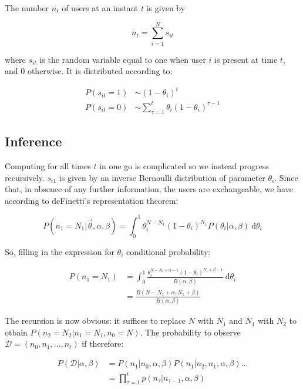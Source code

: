 \documentclass{tufte-book}
\begin{document}
The number $n_t$ of users at an instant $t$ is given by

\begin{equation}
  n_t = \sum_{i=1}^N s_{it}
\end{equation}

where $s_{it}$ is the random variable equal to one when user $i$ is present at time $t$, and $0$ otherwise. It
is distributed according to:

\begin{align*}
  P(s_{it}=1) &\sim \left(1-\theta_i\right)^t\\
  P(s_{it}=0) &\sim \sum_{\tau=1}^t \theta_i \left(1-\theta_i\right)^{\tau-1}
\end{align*}

    \subsection{Inference}%
    \label{sub:inference}

Computing for all times $t$ in one go is complicated so we instead progress recursively. $s_{i1}$ is given by an
inverse Bernoulli distribution of parameter $\theta_i$. Since that, in absence of any further information, the
users are exchangeable, we have according to deFinetti's representation theorem:

\begin{equation}
  P(n_1 = N_1 | \vec{\theta}, \alpha, \beta) = \int_0^1 \theta_i^{N-N_1} \left(1-\theta_i\right)^{N_1}
  P(\theta_i|\alpha, \beta)\: \mathrm{d}\theta_i
\end{equation}

So, filling in the expression for $\theta_i$ conditional probability:

\begin{align}
  P(n_1=N_1) &= \int_0^1 \frac{\theta_i^{N-N_1+\alpha-1}\left(1-\theta_i\right)^{N_1+\beta-1}}{B(\alpha,
  \beta)}\:\mathrm{d}\theta_i \nonumber\\
  &= \frac{B(N-N_1+\alpha, N_1+\beta)}{B(\alpha, \beta)}
\label{sbg:recursion-formula}
\end{align}

The recursion is now obvious: it suffices to replace $N$ with $N_1$ and $N_1$ with $N_2$ to otbain
$P(n_2=N_2|n_1=N_1, n_0=N)$. The probability to observe $
\mathcal{D} = \left(n_0, n_1, \dots, n_t\right)$ if therefore:

\begin{align*}
  P(\mathcal{D} | \alpha, \beta) &= P(n_1|n_0, \alpha, \beta) P(n_1|n_2, n_1, \alpha, \beta) \dots\\
      &= \prod_{\tau=1}^t p(n_\tau|n_{\tau-1}, \alpha, \beta)
\end{align*}
\end{document}

